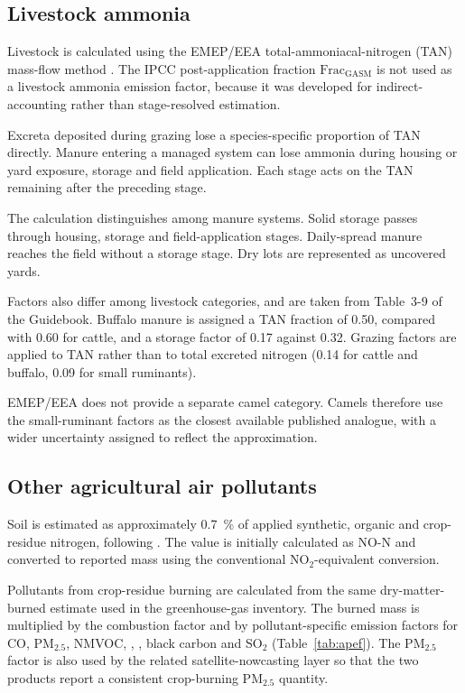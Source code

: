 \subsection{Livestock ammonia}

Livestock \NHthree{} is calculated using the EMEP/EEA total-ammoniacal-nitrogen (TAN)
mass-flow method \citep{emep2023manure,sommer2019}. The IPCC post-application fraction
$\mathrm{Frac_{GASM}}$ is not used as a livestock ammonia emission factor, because it was
developed for indirect-\NtwoO{} accounting rather than stage-resolved \NHthree{} estimation.

Excreta deposited during grazing lose a species-specific proportion of TAN directly. Manure
entering a managed system can lose ammonia during housing or yard exposure, storage and
field application. Each stage acts on the TAN remaining after the preceding stage.

The calculation distinguishes among manure systems. Solid storage passes through housing,
storage and field-application stages. Daily-spread manure reaches the field without a
storage stage. Dry lots are represented as uncovered yards.

Factors also differ among livestock categories, and are taken from Table~3-9 of the
Guidebook. Buffalo manure is assigned a TAN fraction of \num{0.50}, compared with
\num{0.60} for cattle, and a storage factor of \num{0.17} against \num{0.32}. Grazing
factors are applied to TAN rather than to total excreted nitrogen (\num{0.14} for cattle and
buffalo, \num{0.09} for small ruminants).

EMEP/EEA does not provide a separate camel category. Camels therefore use the
small-ruminant factors as the closest available published analogue, with a wider uncertainty
assigned to reflect the approximation.

\subsection{Other agricultural air pollutants}

Soil \NOx{} is estimated as approximately \SI{0.7}{\percent} of applied synthetic, organic
and crop-residue nitrogen, following \citet{stehfest2006}. The value is initially calculated
as NO-N and converted to reported \NOx{} mass using the conventional NO$_2$-equivalent
conversion.

Pollutants from crop-residue burning are calculated from the same dry-matter-burned estimate
used in the greenhouse-gas inventory. The burned mass is multiplied by the combustion factor
and by pollutant-specific emission factors for CO, PM$_{2.5}$, NMVOC, \NOx{}, \NHthree{},
black carbon and SO$_2$ (Table~\ref{tab:apef}). The PM$_{2.5}$ factor is also used by the
related satellite-nowcasting layer so that the two products report a consistent crop-burning
PM$_{2.5}$ quantity.

